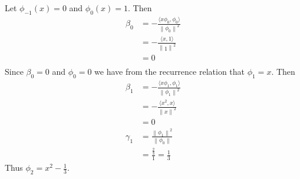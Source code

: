 \documentclass[12pt]{article}
\newcommand{\norm}[1]{\left\lVert#1\right\rVert}
\begin{document}
	Let $\phi_{-1}(x) = 0$ and $\phi_0(x) = 1$. Then 
	\begin{align*}
		\beta_0 & = - \frac{\langle x \phi_0, \phi_0 \rangle}{\norm{\phi_0}^2} \\
		& = - \frac{\langle x, 1 \rangle}{\norm{1}^2} \\
		& = 0 \\
	\end{align*}
	Since $\beta_0 = 0$ and $\phi_0 = 0$ we have from the recurrence relation that $\phi_1 = x$. Then
	\begin{align*}
	\beta_1 & = - \frac{\langle x \phi_1, \phi_1 \rangle}{\norm{\phi_1}^2} \\
		& = - \frac{\langle x^2, x \rangle}{\norm{x}^2} \\
		& = 0 \\
		\gamma_1 & = \frac{\norm{\phi_1}^2}{ \norm{\phi_{0}}} \\
		& = \frac{\tfrac{2}{3}}{1} = \tfrac{1}{3}
	\end{align*}
	Thus $\phi_2 = x^2 - \tfrac{1}{3}$.
		
\end{document}
